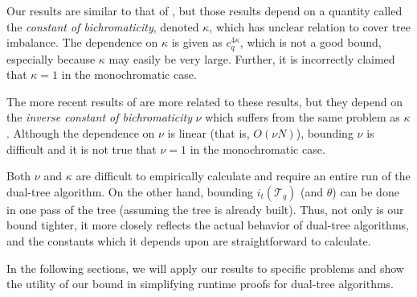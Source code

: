 Our results are similar to that of \citet{ram2009}, but those results depend on
a quantity called the {\it constant of bichromaticity}, denoted $\kappa$, which
has unclear relation to cover tree imbalance.  The dependence on $\kappa$ is
given as $c_q^{4 \kappa}$, which is not a good bound, especially because
$\kappa$ may easily be very large.  Further, it is incorrectly claimed that
$\kappa = 1$ in the monochromatic case.

The more recent results of \citet{curtin2014dual} are more related to these
results, but they depend on the {\it inverse constant of bichromaticity} $\nu$
which suffers from the same problem as $\kappa$.  Although the dependence on
$\nu$ is linear (that is, $O(\nu N)$), bounding $\nu$ is difficult and it is not
true that $\nu = 1$ in the monochromatic case.

Both $\nu$ and $\kappa$ are difficult to empirically calculate and require an
entire run of the dual-tree algorithm.  On the other hand, bounding
$i_t(\mathscr{T}_q)$ (and $\theta$) can be done in one pass of the tree
(assuming the tree is already built).  Thus, not only is our bound tighter, it
more closely reflects the actual behavior of dual-tree algorithms, and the
constants which it depends upon are straightforward to calculate.

In the following sections, we will apply our results to specific problems and
show the utility of our bound in simplifying runtime proofs for dual-tree
algorithms.




